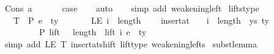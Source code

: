 \begin{isabellebody}
\ {\isacharparenleft}{\kern0pt}Cons\ a\ {\isasymGamma}{}{\isacharparenright}{\kern0pt}\isanewline
\ \ \isamarkupfalse%
\ \isamarkupfalse%
\ {\isacharquery}{\kern0pt}case\isanewline
\ \ \isamarkupfalse%
\ auto\isanewline
\ \ \isamarkupfalse%
\ {\isacharparenleft}{\kern0pt}simp\ add{\isacharcolon}{\kern0pt}\ weakening{\isacharunderscore}{\kern0pt}left{\isacharparenright}{\kern0pt}\isanewline
{}\isamarkupfalse%
%
\endisatagproof
{\isafoldproof}%
%
\isadelimproof
\isanewline
%
\endisadelimproof
\isanewline
\isanewline
{}\isamarkupfalse%
\ lifts{\isacharunderscore}{\kern0pt}type{\isacharcolon}{\kern0pt}\isanewline
\ \ \ T{\isacharcolon}{\kern0pt}\ {\isachardoublequoteopen}{\isasymGamma}\ {\isasymturnstile}{\isacharbraceleft}{\kern0pt}P{\isacharbraceright}{\kern0pt}\ e\ {\isacharcolon}{\kern0pt}\ ty{\isachardoublequoteclose}\isanewline
\ \ \ \ \ \ \ LE{\isacharcolon}{\kern0pt}\ {\isachardoublequoteopen}i\ {\isasymle}\ length\ {\isasymGamma}{\isachardoublequoteclose}\isanewline
\ \ \ {\isachardoublequoteopen}insert{\isacharunderscore}{\kern0pt}at\ {\isacharparenleft}{\kern0pt}{\isasymGamma}{}\ {\isacharat}{\kern0pt}\ {\isasymGamma}{\isacharparenright}{\kern0pt}\ {\isacharparenleft}{\kern0pt}i\ {\isacharplus}{\kern0pt}\ length\ {\isasymGamma}{}{\isacharparenright}{\kern0pt}\ {\isacharparenleft}{\kern0pt}ys{\isacharcomma}{\kern0pt}\ ty{}{\isacharparenright}{\kern0pt}\isanewline
\ \ \ \ \ \ \ \ \ {\isasymturnstile}{\isacharbraceleft}{\kern0pt}P{\isacharbraceright}{\kern0pt}\ {\isacharparenleft}{\kern0pt}lift\ {}\ {\isacharcircum}{\kern0pt}{\isacharcircum}{\kern0pt}\ length\ {\isasymGamma}{}{\isacharparenright}{\kern0pt}\ {\isacharparenleft}{\kern0pt}lift\ i\ e{\isacharparenright}{\kern0pt}\ {\isacharcolon}{\kern0pt}\ ty{\isachardoublequoteclose}\isanewline
%
\isadelimproof
%
\endisadelimproof
%
\isatagproof
{}\isamarkupfalse%
\ {\isacharparenleft}{\kern0pt}simp\ add{\isacharcolon}{\kern0pt}\ LE\ T\ insert{\isacharunderscore}{\kern0pt}at{\isacharunderscore}{\kern0pt}shift\ lift{\isacharunderscore}{\kern0pt}type\ weakening{\isacharunderscore}{\kern0pt}lefts{}{\isacharparenright}{\kern0pt}%
\endisatagproof
{\isafoldproof}%
%
\isadelimproof
\isanewline
%
\endisadelimproof
\isanewline
\isanewline
{}\isamarkupfalse%
\ subst{\isacharunderscore}{\kern0pt}lemma{\isacharcolon}{\kern0pt}\isanewline

\end{isabellebody}
